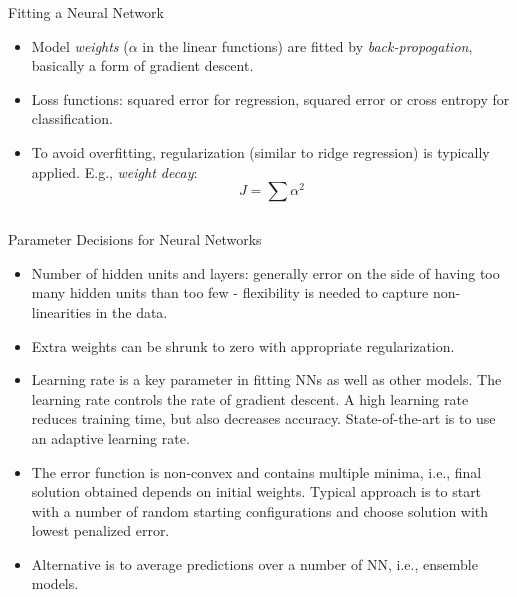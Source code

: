 \documentclass{beamer}
\begin{document}
\begin{frame}{Fitting a Neural Network}
    \begin{itemize}
        \item Model \textit{weights} ($\alpha$ in the linear functions) are fitted by \textit{back-propogation}, basically a form of gradient descent.
        \item Loss functions: squared error for regression, squared error or cross entropy for classification.
        \item To avoid overfitting, regularization (similar to ridge regression) is typically applied. E.g., \textit{weight decay}:
        \begin{equation*}
            J = \sum \alpha^2
        \end{equation*}
    \end{itemize}
\end{frame}


\begin{frame}[fragile]{}
\begin{verbatim}
\end{verbatim}
\end{frame}


\begin{frame}{Parameter Decisions for Neural Networks}
    \begin{itemize}
        \item Number of hidden units and layers: generally error on the side of having too many hidden units than too few - flexibility is needed to capture non-linearities in the data.
        \item Extra weights can be shrunk to zero with appropriate regularization.
        \item Learning rate is a key parameter in fitting NNs as well as other models. The learning rate controls the rate of gradient descent. A high learning rate reduces training time, but also decreases accuracy. State-of-the-art is to use an adaptive learning rate. 
        \item The error function is non-convex and contains multiple minima, i.e., final solution obtained depends on initial weights. Typical approach is to start with a number of random starting configurations and choose solution with lowest penalized error.
        \item Alternative is to average predictions over a number of NN, i.e., ensemble models.
    \end{itemize}
\end{frame}
\end{document}
